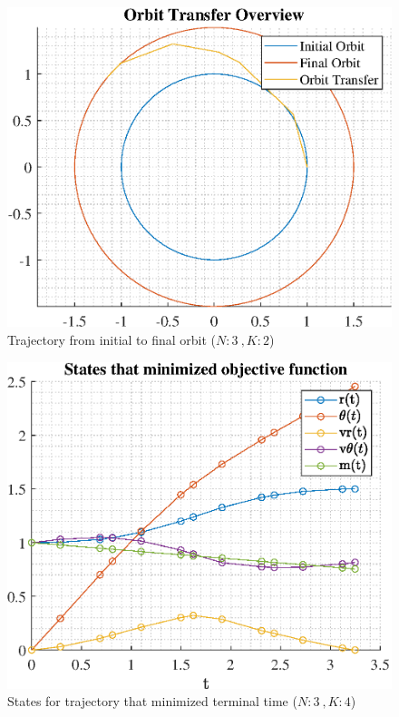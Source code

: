 \documentclass[]{article}
\begin{document}
\begin{figure}
	\centering
	\includegraphics[scale=0.75]{orbit_N3_K2_C2_tf.eps}
	\caption{Trajectory from initial to final orbit (\(N:3\ , K:2\))}
	\label{fig:orbit_N3_K2_C2_tf}
\end{figure}
\begin{figure}
	\centering
	\includegraphics[scale=0.75]{states_N3_K4_C2_tf.eps}
	\caption{States for trajectory that minimized terminal time (\(N:3\ , K:4\))}
	\label{fig:states_N3_K4_C2_tf}
\end{figure}
\end{document}
